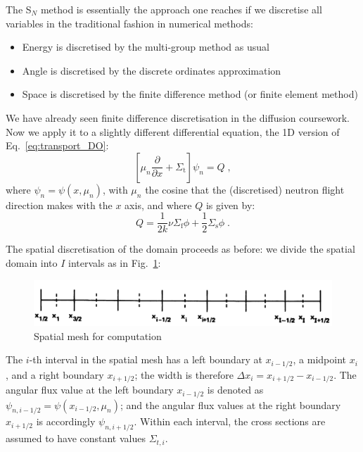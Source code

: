 \documentclass{article}
\begin{document}
The S$_N$ method is essentially the approach one reaches if we discretise all variables in the traditional fashion in numerical methods:
\begin{itemize}
	\item Energy is discretised by the multi-group method as usual
	\item Angle is discretised by the discrete ordinates approximation
	\item Space is discretised by the finite difference method (or finite element method)
\end{itemize}
We have already seen finite difference discretisation in the diffusion coursework. Now we apply it to a slightly different differential equation, the 1D version of Eq.~\eqref{eq:transport_DO}:
\begin{equation}\label{eq:DO}
	 \left[\mu_n\frac{\partial}{\partial x} + \Sigma_\mathrm{t}\right]\psi_n
	= Q\;\mathrm{,}
\end{equation}
where $\psi_n = \psi(x,\mu_n)$, with $\mu_n$ the cosine that the (discretised) neutron flight direction makes with the $x$ axis, and where $Q$ is given by:
\begin{equation}
	Q = \frac{1}{2k}\nu\Sigma_\mathrm{f}\phi + \frac{1}{2}\Sigma_\mathrm{s}\phi\;\mathrm{.}
\end{equation}

The spatial discretisation of the domain proceeds as before: we divide the spatial domain into $I$ intervals as in Fig.~\ref{fig6}:
\begin{figure}[hb]
    \centering
    \includegraphics[width=0.6\linewidth]{images/fig6.png}
    \caption{Spatial mesh for computation~\cite{Lewis}}
    \label{fig6}
\end{figure}
The $i$-th interval in the spatial mesh has a left boundary at $x_{i-1/2}$, a midpoint $x_i$, and a right boundary $x_{i+1/2}$; the width is therefore $\Delta x_i=x_{i+1/2}-x_{i-1/2}$. The angular flux value at the left boundary $x_{i-1/2}$ is denoted as $\psi_{n,i-1/2}=\psi(x_{i-1/2},\mu_n)$; and the angular flux values at the right boundary $x_{i+1/2}$ is accordingly $\psi_{n,i+1/2}$. Within each interval, the cross sections are assumed to have constant values $\Sigma_{t,i}$.
\end{document}
